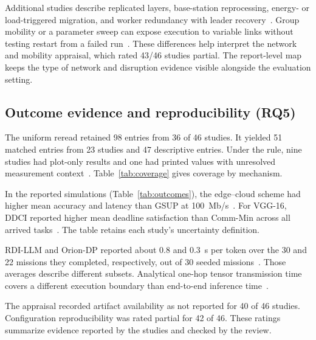 \documentclass[pdflatex,sn-vancouver-num]{sn-jnl}
\begin{document}
Additional studies describe replicated layers, base-station reprocessing, energy- or load-triggered migration, and worker redundancy with leader recovery~\cite{R0029,R0044,R0045,R0110}. Group mobility or a parameter sweep can expose execution to variable links without testing restart from a failed run~\cite{R0083,R0118}. These differences help interpret the network and mobility appraisal, which rated 43/46 studies partial. The report-level map keeps the type of network and disruption evidence visible alongside the evaluation setting.

\subsection{Outcome evidence and reproducibility (RQ5)}\label{sec:rq5}
The uniform reread retained 98 entries from 36 of 46 studies. It yielded 51 matched entries from 23 studies and 47 descriptive entries. Under the rule, nine studies had plot-only results and one had printed values with unresolved measurement context~\cite{R0113}. Table~\ref{tab:coverage} gives coverage by mechanism.

In the reported simulations (Table~\ref{tab:outcomes}), the edge--cloud scheme had higher mean accuracy and latency than GSUP at 100~Mb/s~\cite{R0080}. For VGG-16, DDCI reported higher mean deadline satisfaction than Comm-Min across all arrived tasks~\cite{R0092}. The table retains each study's uncertainty definition.

RDI-LLM and Orion-DP reported about 0.8 and 0.3~s per token over the 30 and 22 missions they completed, respectively, out of 30 seeded missions~\cite{R0110}. Those averages describe different subsets. Analytical one-hop tensor transmission time covers a different execution boundary than end-to-end inference time~\cite{R0121,R0080}.

The appraisal recorded artifact availability as not reported for 40 of 46 studies. Configuration reproducibility was rated partial for 42 of 46. These ratings summarize evidence reported by the studies and checked by the review.
\end{document}

